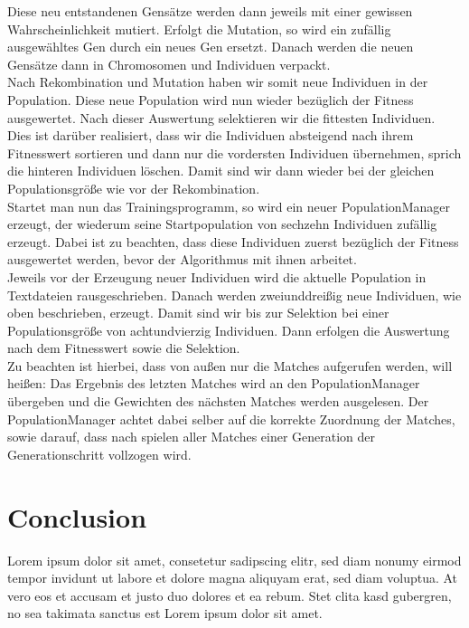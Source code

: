 \documentclass[
	12pt,
	a4paper,
	BCOR10mm,
	DIV14,
	headsepline,
	usegeometry,
]{scrreprt}
\begin{document}
Diese neu entstandenen Gensätze werden dann jeweils mit einer gewissen Wahrscheinlichkeit mutiert. Erfolgt die Mutation, so wird ein zufällig ausgewähltes Gen durch ein neues Gen ersetzt. Danach werden die neuen Gensätze dann in Chromosomen und Individuen verpackt.\\
Nach Rekombination und Mutation haben wir somit neue Individuen in der Population. Diese neue Population wird nun wieder bezüglich der Fitness ausgewertet. Nach dieser Auswertung selektieren wir die fittesten Individuen. Dies ist darüber realisiert, dass wir die Individuen absteigend nach ihrem Fitnesswert sortieren und dann nur die vordersten Individuen übernehmen, sprich die hinteren Individuen löschen. Damit sind wir dann wieder bei der gleichen Populationsgröße wie vor der Rekombination.\\
Startet man nun das Trainingsprogramm, so wird ein neuer PopulationManager erzeugt, der wiederum seine Startpopulation von sechzehn Individuen zufällig erzeugt. Dabei ist zu beachten, dass diese Individuen zuerst bezüglich der Fitness ausgewertet werden, bevor der Algorithmus mit ihnen arbeitet.\\
Jeweils vor der Erzeugung neuer Individuen wird die aktuelle Population in Textdateien rausgeschrieben. Danach werden zweiunddreißig neue Individuen, wie oben beschrieben, erzeugt. Damit sind wir bis zur Selektion bei einer Populationsgröße von achtundvierzig Individuen. Dann erfolgen die Auswertung nach dem Fitnesswert sowie die Selektion.\\
Zu beachten ist hierbei, dass von außen nur die Matches aufgerufen werden, will heißen: Das Ergebnis des letzten Matches wird an den PopulationManager übergeben und die Gewichten des nächsten Matches werden ausgelesen. Der PopulationManager achtet dabei selber auf die korrekte Zuordnung der Matches, sowie darauf, dass nach spielen aller Matches einer Generation der Generationschritt vollzogen wird.

\chapter{Conclusion}
\label{Conclusion}

Lorem ipsum dolor sit amet, consetetur sadipscing elitr, sed diam nonumy eirmod tempor invidunt ut labore et dolore magna aliquyam erat, sed diam voluptua.
At vero eos et accusam et justo duo dolores et ea rebum.
Stet clita kasd gubergren, no sea takimata sanctus est Lorem ipsum dolor sit amet.



\end{document}
